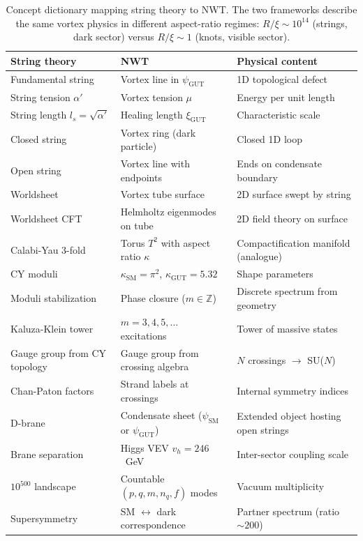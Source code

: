 \documentclass[11pt]{article}
\begin{document}
\begin{table}[h]
\centering
\caption{Concept dictionary mapping string theory to NWT.  The two frameworks describe the same vortex physics in different aspect-ratio regimes: $R/\xi \sim 10^{14}$ (strings, dark sector) versus $R/\xi \sim 1$ (knots, visible sector).}
\label{tab:dictionary}
\begin{tabular}{@{}lll@{}}
\toprule
\textbf{String theory} & \textbf{NWT} & \textbf{Physical content} \\
\midrule
Fundamental string & Vortex line in $\psi_\text{GUT}$ & 1D topological defect \\
String tension $\alpha'$ & Vortex tension $\mu$ & Energy per unit length \\
String length $l_s = \sqrt{\alpha'}$ & Healing length $\xi_\text{GUT}$ & Characteristic scale \\
Closed string & Vortex ring (dark particle) & Closed 1D loop \\
Open string & Vortex line with endpoints & Ends on condensate boundary \\
Worldsheet & Vortex tube surface & 2D surface swept by string \\
Worldsheet CFT & Helmholtz eigenmodes on tube & 2D field theory on surface \\
\midrule
Calabi-Yau 3-fold & Torus $T^2$ with aspect ratio $\kappa$ & Compactification manifold (analogue) \\
CY moduli & $\kappa_\text{SM} = \pi^2$, $\kappa_\text{GUT} = 5.32$ & Shape parameters \\
Moduli stabilization & Phase closure ($m \in \mathbb{Z}$) & Discrete spectrum from geometry \\
Kaluza-Klein tower & $m = 3, 4, 5, \ldots$ excitations & Tower of massive states \\
\midrule
Gauge group from CY topology & Gauge group from crossing algebra & $N$ crossings $\to$ SU($N$) \\
Chan-Paton factors & Strand labels at crossings & Internal symmetry indices \\
D-brane & Condensate sheet ($\psi_\text{SM}$ or $\psi_\text{GUT}$) & Extended object hosting open strings \\
Brane separation & Higgs VEV $v_h = 246$~GeV & Inter-sector coupling scale \\
\midrule
$10^{500}$ landscape & Countable $(p,q,m,n_q,f)$ modes & Vacuum multiplicity \\
Supersymmetry & SM $\leftrightarrow$ dark correspondence & Partner spectrum (ratio $\sim 200$) \\
\bottomrule
\end{tabular}
\end{table}
\end{document}
